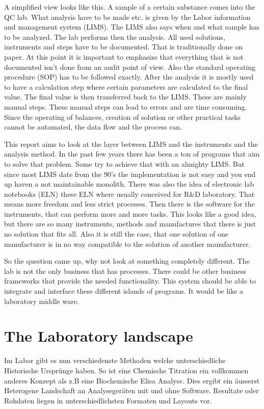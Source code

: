 \documentclass[paper=a4,twoside=false,BCOR=0mm,DIV=calc,fontsize=12pt]{scrartcl}
\begin{document}
A simplified view looks like this. A sample of a certain substance comes into the QC lab. What analysis have to be made etc. is given by the Labor information and management system (LIMS). The LIMS also says when and what sample has to be analyzed.
The lab performs then the analysis. All used solutions, instruments and steps have to be documented. That is traditionally done on paper. At this point it is important to emphasize that everything that is not documented isn't done from an audit point of view. Also the standard operating procedure (SOP) has to be followed exactly.
After the analysis it is mostly used to have a calculation step where certain parameters are calculated to the final value. The final value is then transferred back to the LIMS. These are mainly manual steps. These manual steps can lead to errors and are time consuming.
Since the operating of balances, creation of solution or other practical tasks cannot be automated, the data flow and the process can.

This report aims to look at the layer between LIMS and the instruments and the analysis method. In the past few years there has been a ton of programs that aim to solve that problem. Some try to achieve that with an almighty LIMS. But since most LIMS date from the 90's the implementation is not easy and you end up haven a not maintainable monolith. There was also the idea of electronic lab notebooks (ELN) these ELN where usually conceived for R&D laboratory. That means more freedom and less strict processes.
Then there is the software for the instruments, that can perform more and more tasks. This looks like a good idea, but there are so many instruments, methods and manufactures that there is just no solution that fits all. Also it is still the case, that one solution of one manufacturer is in no way compatible to the solution of another manufacturer.

So the question came up, why not look at something completely different. The lab is not the only business that has processes. There could be other business frameworks that provide the needed functionality. This system should be able to integrate and interface these different islands of programs. It would be like a laboratory middle ware.



\section{The Laboratory landscape}
Im Labor gibt es nun verschiedenste Methoden welche unterschiedliche Historische Ursprünge haben. So ist eine Chemische Titration ein
vollkommen anderes Konzept als z.B eine Biochemische Elisa Analyse.
Dies ergibt ein äusserst Heterogene Landschaft an Analysegeräten mit und ohne Software. Resultate oder Rohdaten liegen in unterschiedlichsten Formaten und Layouts vor.
\end{document}
